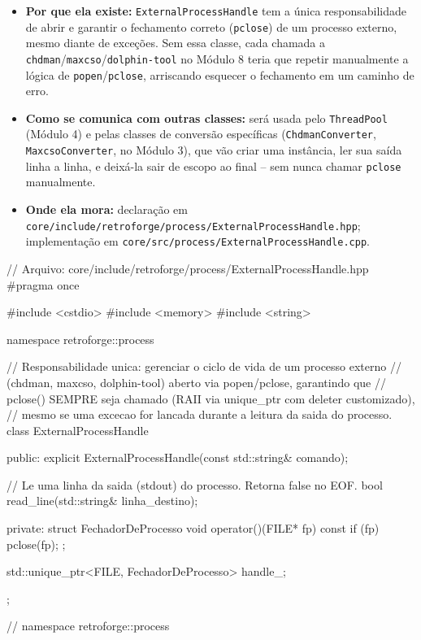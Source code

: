 \begin{itemize}
    \item \textbf{Por que ela existe:} \texttt{ExternalProcessHandle} tem a única responsabilidade de abrir e garantir o fechamento correto (\texttt{pclose}) de um processo externo, mesmo diante de exceções. Sem essa classe, cada chamada a \texttt{chdman}/\texttt{maxcso}/\texttt{dolphin-tool} no Módulo 8 teria que repetir manualmente a lógica de \texttt{popen}/\texttt{pclose}, arriscando esquecer o fechamento em um caminho de erro.
    \item \textbf{Como se comunica com outras classes:} será usada pelo \texttt{ThreadPool} (Módulo 4) e pelas classes de conversão específicas (\texttt{ChdmanConverter}, \texttt{MaxcsoConverter}, no Módulo 3), que vão criar uma instância, ler sua saída linha a linha, e deixá-la sair de escopo ao final -- sem nunca chamar \texttt{pclose} manualmente.
    \item \textbf{Onde ela mora:} declaração em \texttt{core/include/retroforge/process/ExternalProcessHandle.hpp}; implementação em \texttt{core/src/process/ExternalProcessHandle.cpp}.
\end{itemize}

\begin{CaixaCodigo}
// Arquivo: core/include/retroforge/process/ExternalProcessHandle.hpp
#pragma once

#include <cstdio>
#include <memory>
#include <string>

namespace retroforge::process {

// Responsabilidade unica: gerenciar o ciclo de vida de um processo externo
// (chdman, maxcso, dolphin-tool) aberto via popen/pclose, garantindo que
// pclose() SEMPRE seja chamado (RAII via unique_ptr com deleter customizado),
// mesmo se uma excecao for lancada durante a leitura da saida do processo.
class ExternalProcessHandle {
public:
    explicit ExternalProcessHandle(const std::string& comando);

    // Le uma linha da saida (stdout) do processo. Retorna false no EOF.
    bool read_line(std::string& linha_destino);

private:
    struct FechadorDeProcesso {
        void operator()(FILE* fp) const {
            if (fp) {
                pclose(fp);
            }
        }
    };

    std::unique_ptr<FILE, FechadorDeProcesso> handle_;
};

} // namespace retroforge::process
\end{CaixaCodigo}


